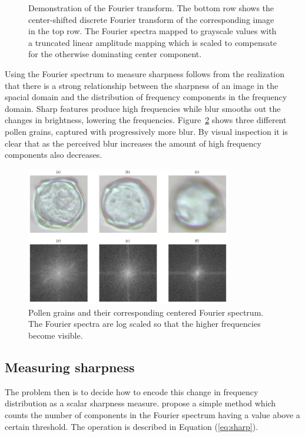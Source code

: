 \begin{figure}[htbp]
\begin{subfigure}[t]{0.2\textwidth}
  \end{subfigure}
  \caption[Demonstration of the Fourier transform]{
    Demonstration of the Fourier transform.
The bottom row shows the center-shifted discrete Fourier transform of the corresponding image in the top row.
The Fourier spectra mapped to grayscale values with a truncated linear amplitude mapping which is scaled to compensate for the otherwise dominating center component.}\label{fig:fourier-demo}
\end{figure}

Using the Fourier spectrum to measure sharpness follows from the realization that there is a strong relationship between the sharpness of an image in the spacial domain and the distribution of frequency components in the frequency domain.
Sharp features produce high frequencies while blur smooths out the changes in brightness, lowering the frequencies.
Figure~\ref{fig:fourier} shows three different pollen grains, captured with progressively more blur.
By visual inspection it is clear that as the perceived blur increases the amount of high frequency components also decreases.


\begin{figure}[htbp]
  \centering
  \includegraphics[width=0.8\textwidth]{figs/method/fourier/fourier.png}
  \caption[Fourier spectrum]{Pollen grains and their corresponding centered Fourier spectrum.
The Fourier spectra are log scaled so that the higher frequencies become visible.}\label{fig:fourier}
\end{figure}

\subsection{Measuring sharpness}
The problem then is to decide how to encode this change in frequency distribution as a scalar sharpness measure.
\citeauthor{de2013image} propose a simple method which counts the number of components in the Fourier spectrum having a value above a certain threshold.
The operation is described in Equation (\ref{eq:sharp}).



